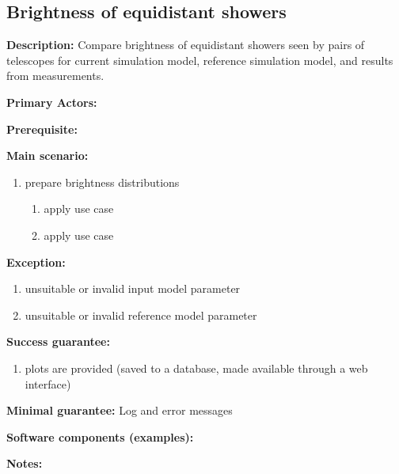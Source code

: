 \subsection{Brightness of equidistant showers}
\label{validation:Brightnessofequidistantshowers}
\textbf{Description:}
Compare brightness of equidistant showers seen by pairs of telescopes for current simulation model, reference simulation model, and results from measurements.


\textbf{Primary Actors:}

\textbf{Prerequisite:}

\textbf{Main scenario:}

\begin{enumerate}
    \item prepare brightness distributions 
    \begin{enumerate}
        \item apply use case 
        \item apply use case 
    \end{enumerate}
\end{enumerate}

\textbf{Exception:}
\begin{enumerate}
    \item unsuitable or invalid input model parameter
    \item unsuitable or invalid reference model parameter
\end{enumerate}

\textbf{Success guarantee:}
\begin{enumerate}
    \item plots are provided (saved to a database, made available through a web interface)
\end{enumerate}

\textbf{Minimal guarantee:}
Log and error messages

\textbf{Software components (examples):}

\textbf{Notes:}




